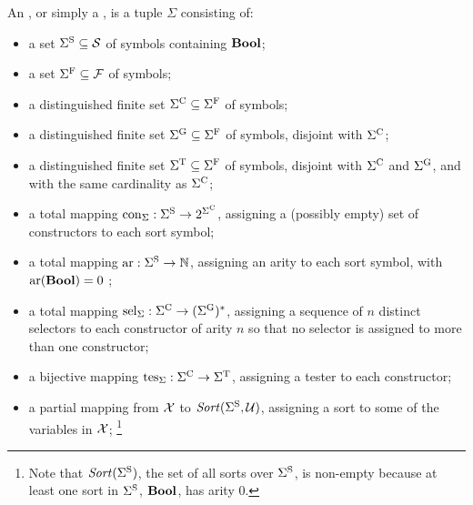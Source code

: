 \begin{definition}
\label{def:signature}
An , or simply a ,
is a tuple $\Sigma$ consisting of:

\begin{itemize}
\item
a set $\Sigma^\mathrm{S} \subseteq \mathcal{S}$ of  symbols containing $\textbf{Bool}$;

\item
a set $\Sigma^\mathrm{F} \subseteq \mathcal{F}$ of  symbols;

\item
a distinguished finite set $\Sigma^\mathrm{C} \subseteq \Sigma^\mathrm{F}$ 
of  symbols;

\item
a distinguished finite set $\Sigma^\mathrm{G} \subseteq \Sigma^\mathrm{F}$ 
of  symbols,
disjoint with $\Sigma^\mathrm{C}$;

\item
a distinguished finite set $\Sigma^\mathrm{T} \subseteq \Sigma^\mathrm{F}$ 
of  symbols,
disjoint with $\Sigma^\mathrm{C}$ and $\Sigma^\mathrm{G}$, and with the same cardinality
as $\Sigma^\mathrm{C}$;

\item
a total mapping $\mathrm{con}_\Sigma:\Sigma^\mathrm{S} \to 2^{\Sigma^\mathrm{C}}$,
assigning a (possibly empty) set of constructors to each sort symbol;

\item
a total mapping $\mathrm{ar}:\Sigma^\mathrm{S} \to \mathbb{N}$,
assigning an arity to each sort symbol,
with $\mathrm{ar}(\textbf{Bool}) = 0$ ;

\item
a total mapping $\mathrm{sel}_\Sigma:\Sigma^\mathrm{C} \to (\Sigma^\mathrm{G})^*$,
assigning a sequence of $n$ distinct selectors to each constructor of arity $n$
so that no selector is assigned to more than one constructor;

\item
a bijective mapping $\mathrm{tes}_\Sigma:\Sigma^\mathrm{C} \to \Sigma^\mathrm{T}$,
assigning a tester to each constructor;

\item
a partial mapping from $\mathcal{X}$ to $\mathit{Sort}(\Sigma^\mathrm{S}, \mathcal{U})$,
assigning a sort to some of the variables in $\mathcal{X}$;%
\footnote{%
Note that $\mathit{Sort}(\Sigma^\mathrm{S})$, the set of all sorts over $\Sigma^\mathrm{S}$, is 
non-empty because at least one sort in $\Sigma^\mathrm{S}$, $\textbf{Bool}$, has arity 0.
}


\end{itemize}
\end{definition}
